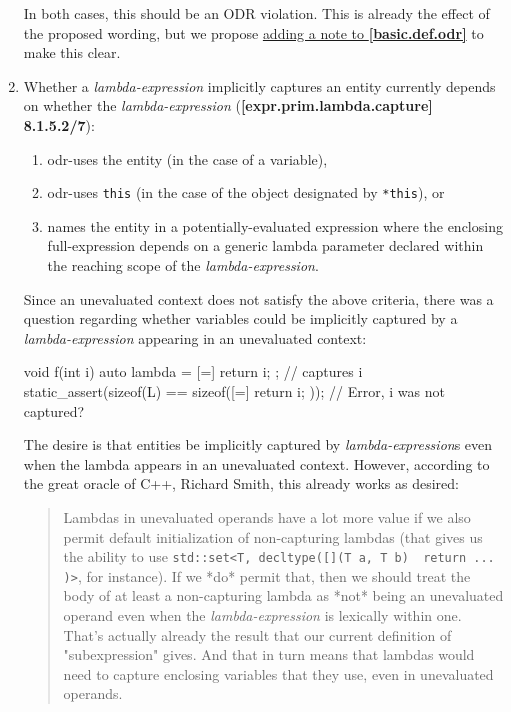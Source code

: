 \documentclass{wg21}
\newcommand{\cc}[1]{\texttt{#1}}
\begin{document}
\begin{enumerate}
    In both cases, this should be an ODR violation. This is already the effect
    of the proposed wording, but we propose \hyperref[wording.nontype]{adding
    a note to \textbf{[basic.def.odr]}} to make this clear.


  \item \label{discussion.capture}
    Whether a \textit{lambda-expression} implicitly captures an entity
    currently depends on whether the \textit{lambda-expression}
    (\textbf{[expr.prim.lambda.capture] 8.1.5.2/7}):
    \begin{enumerate}
      \item odr-uses the entity (in the case of a variable),
      \item odr-uses \cc{this} (in the case of the object designated by \cc{*this}), or
      \item names the entity in a potentially-evaluated expression where the
            enclosing full-expression depends on a generic lambda parameter
            declared within the reaching scope of the \textit{lambda-expression}.
    \end{enumerate}

    Since an unevaluated context does not satisfy the above criteria, there
    was a question regarding whether variables could be implicitly captured
    by a \textit{lambda-expression} appearing in an unevaluated context:
\begin{cpp}
void f(int i) {
  auto lambda = [=]{ return i; }; // captures i
  static_assert(sizeof(L) == sizeof([=]{ return i; })); // Error, i was not captured?
}
\end{cpp}

    The desire is that entities be implicitly captured by \textit{lambda-expression}s
    even when the lambda appears in an unevaluated context. However, according
    to the great oracle of C++, Richard Smith, this already works as desired:

    \begin{quote}
      Lambdas in unevaluated operands have a lot more value if we also permit
      default initialization of non-capturing lambdas (that gives us the ability
      to use \cc{std::set<T, decltype([](T a, T b) { return ... })>}, for
      instance). If we *do* permit that, then we should treat the body of at
      least a non-capturing lambda as *not* being an unevaluated operand even
      when the \textit{lambda-expression} is lexically within one. That's
      actually already the result that our current definition of "subexpression"
      gives. And that in turn means that lambdas would need to capture
      enclosing variables that they use, even in unevaluated operands.
    \end{quote}


\end{enumerate}
\end{document}

